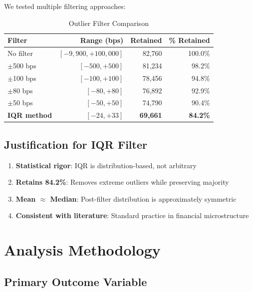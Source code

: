 \documentclass[11pt,a4paper]{article}
\begin{document}
We tested multiple filtering approaches:

\begin{table}[H]
\centering
\caption{Outlier Filter Comparison}
\begin{tabular}{lrrr}
\toprule
\textbf{Filter} & \textbf{Range (bps)} & \textbf{Retained} & \textbf{\% Retained} \\
\midrule
No filter & $[-9,900, +100,000]$ & 82,760 & 100.0\% \\
$\pm$500 bps & $[-500, +500]$ & 81,234 & 98.2\% \\
$\pm$100 bps & $[-100, +100]$ & 78,456 & 94.8\% \\
$\pm$80 bps & $[-80, +80]$ & 76,892 & 92.9\% \\
$\pm$50 bps & $[-50, +50]$ & 74,790 & 90.4\% \\
\textbf{IQR method} & $[-24, +33]$ & \textbf{69,661} & \textbf{84.2\%} \\
\bottomrule
\end{tabular}
\end{table}

\subsection{Justification for IQR Filter}

\begin{enumerate}
    \item \textbf{Statistical rigor}: IQR is distribution-based, not arbitrary
    \item \textbf{Retains 84.2\%}: Removes extreme outliers while preserving majority
    \item \textbf{Mean $\approx$ Median}: Post-filter distribution is approximately symmetric
    \item \textbf{Consistent with literature}: Standard practice in financial microstructure
\end{enumerate}

\section{Analysis Methodology}

\subsection{Primary Outcome Variable}
\end{document}

